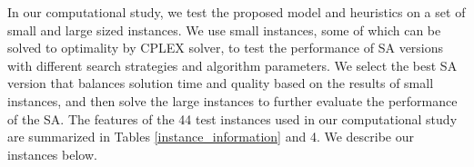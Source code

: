 \documentclass[11pt]{article}
\begin{document}


In our computational study, we test the proposed model and heuristics on a set of small and large sized instances. We use small instances, some of which can be solved to optimality by CPLEX solver, to test the performance of SA versions with different search strategies and algorithm parameters. We select the best SA version that balances solution time and quality based on the results of small instances, and then solve the large instances to further evaluate the performance of the SA. The features of the 44 test instances used in our computational study are summarized in Tables \ref{instance_information} and 4. We describe our instances below.
\end{document}
